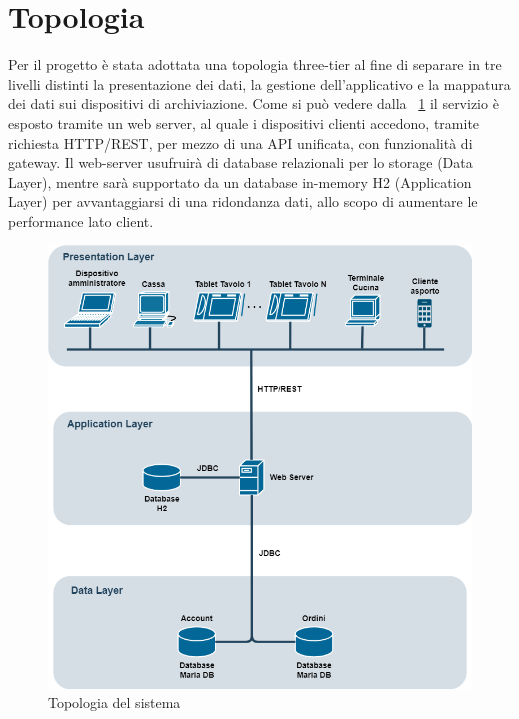\section{Topologia}
Per il progetto è stata adottata una topologia three-tier al fine di separare in tre livelli distinti la presentazione dei dati, la gestione dell’applicativo e la mappatura dei dati sui dispositivi di archiviazione. Come si può vedere dalla \figurename~\ref{fig:topologia} il servizio è esposto tramite un web server, al quale i dispositivi clienti accedono, tramite richiesta HTTP/REST, per mezzo di una API unificata, con funzionalità di gateway. Il web-server usufruirà di database relazionali per lo storage (Data Layer), mentre sarà supportato da un database in-memory H2 (Application Layer) per avvantaggiarsi di una ridondanza dati, allo scopo di aumentare le performance lato client.

\begin{figure}[htbp]
	\centering
	
	\includegraphics[scale=0.5]{iterazione0/images/topologia}
	\caption{Topologia del sistema\label{fig:topologia}}
\end{figure}

\clearpage